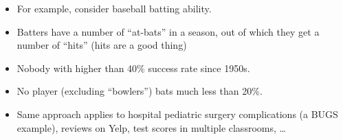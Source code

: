 \documentclass[10pt]{report}
\begin{document}


%
\begin{itemize}
\item For example, consider baseball batting ability.
\item Batters have a number of ``at-bats'' in a season, out of which they
  get a number of ``hits'' (hits are a good thing)
\item Nobody with higher than 40\% success rate since 1950s.
\item No player (excluding ``bowlers'') bats much less than 20\%.
\item Same approach applies to hospital pediatric surgery
  complications (a BUGS example), reviews on Yelp,
  test scores in multiple classrooms, \ldots
\end{itemize}
\end{document}

